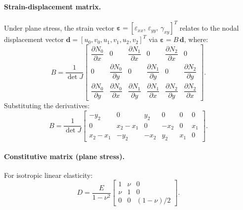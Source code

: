 \paragraph{Strain-displacement matrix.}
Under plane stress, the strain vector $\boldsymbol{\varepsilon} = [\varepsilon_{xx},\, \varepsilon_{yy},\, \gamma_{xy}]^T$ relates to the nodal displacement vector $\mathbf{d} = [u_0, v_0, u_1, v_1, u_2, v_2]^T$ via $\boldsymbol{\varepsilon} = B\,\mathbf{d}$, where:
\begin{equation}
  B = \frac{1}{\det J}
  \begin{bmatrix}
    \dfrac{\partial N_0}{\partial x} & 0 &
    \dfrac{\partial N_1}{\partial x} & 0 &
    \dfrac{\partial N_2}{\partial x} & 0 \\[6pt]
    0 & \dfrac{\partial N_0}{\partial y} &
    0 & \dfrac{\partial N_1}{\partial y} &
    0 & \dfrac{\partial N_2}{\partial y} \\[6pt]
    \dfrac{\partial N_0}{\partial y} & \dfrac{\partial N_0}{\partial x} &
    \dfrac{\partial N_1}{\partial y} & \dfrac{\partial N_1}{\partial x} &
    \dfrac{\partial N_2}{\partial y} & \dfrac{\partial N_2}{\partial x}
  \end{bmatrix}.
\end{equation}
Substituting the derivatives:
\begin{equation}\label{eq:B-explicit}
  B = \frac{1}{\det J}
  \begin{bmatrix}
    -y_2    & 0        & y_2  & 0    & 0   & 0  \\
    0       & x_2-x_1  & 0    & -x_2 & 0   & x_1 \\
    x_2-x_1 & -y_2     & -x_2 & y_2  & x_1 & 0
  \end{bmatrix}.
\end{equation}

\paragraph{Constitutive matrix (plane stress).}
For isotropic linear elasticity:
\begin{equation}
  D = \frac{E}{1 - \nu^2}
  \begin{bmatrix}
    1   & \nu & 0 \\
    \nu & 1   & 0 \\
    0   & 0   & (1-\nu)/2
  \end{bmatrix}.
\end{equation}

